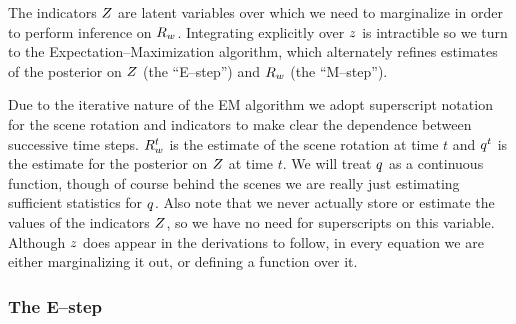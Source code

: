 The indicators $\Indicators$ are latent variables over which we need
to marginalize in order to perform inference on $\SceneR$. Integrating
explicitly over $\Indicator$ is intractible so we turn to the
Expectation--Maximization algorithm, which alternately refines
estimates of the posterior on $\Indicators$ (the ``E--step'') and
$\SceneR$ (the ``M--step'').

Due to the iterative nature of the EM algorithm we adopt superscript
notation for the scene rotation and indicators to make clear the
dependence between successive time steps. $\SceneR^t$ is the estimate
of the scene rotation at time $t$ and $\PosteriorEst^t$ is the
estimate for the posterior on $\Indicators$ at time $t$. We will treat
$\PosteriorEst$ as a continuous function, though of course behind the
scenes we are really just estimating sufficient statistics for
$\PosteriorEst$. Also note that we never actually store or estimate
the values of the indicators $\Indicators$, so we have no need for
superscripts on this variable. Although $\Indicator$ does appear in
the derivations to follow, in every equation we are either
marginalizing it out, or defining a function over it.

\subsubsection{The E--step}

